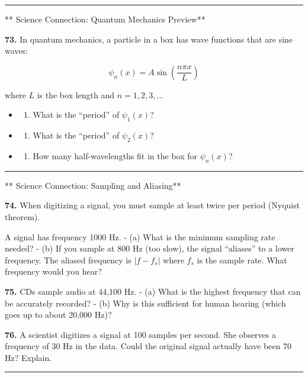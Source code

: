\documentclass[
  11pt,
]{article}
\providecommand{\tightlist}{%
  \setlength{\itemsep}{0pt}\setlength{\parskip}{0pt}}
\begin{document}
\begin{center}\rule{0.5\linewidth}{0.5pt}\end{center}

** Science Connection: Quantum Mechanics Preview**

\textbf{73.} In quantum mechanics, a particle in a box has wave
functions that are sine waves:

\[\psi_n(x) = A\sin\left(\frac{n\pi x}{L}\right)\]

where \(L\) is the box length and \(n = 1, 2, 3, ...\)

\begin{itemize}
\item
  \begin{enumerate}
  \def\labelenumi{(\alph{enumi})}
  \tightlist
  \item
    What is the ``period'' of \(\psi_1(x)\)?
  \end{enumerate}
\item
  \begin{enumerate}
  \def\labelenumi{(\alph{enumi})}
  \setcounter{enumi}{1}
  \tightlist
  \item
    What is the ``period'' of \(\psi_2(x)\)?
  \end{enumerate}
\item
  \begin{enumerate}
  \def\labelenumi{(\alph{enumi})}
  \setcounter{enumi}{2}
  \tightlist
  \item
    How many half-wavelengths fit in the box for \(\psi_n(x)\)?
  \end{enumerate}
\end{itemize}

\begin{center}\rule{0.5\linewidth}{0.5pt}\end{center}

** Science Connection: Sampling and Aliasing**

\textbf{74.} When digitizing a signal, you must sample at least twice
per period (Nyquist theorem).

A signal has frequency 1000 Hz. - (a) What is the minimum sampling rate
needed? - (b) If you sample at 800 Hz (too slow), the signal ``aliases''
to a lower frequency. The aliased frequency is \(|f - f_s|\) where
\(f_s\) is the sample rate. What frequency would you hear?

\textbf{75.} CDs sample audio at 44,100 Hz. - (a) What is the highest
frequency that can be accurately recorded? - (b) Why is this sufficient
for human hearing (which goes up to about 20,000 Hz)?

\textbf{76.} A scientist digitizes a signal at 100 samples per second.
She observes a frequency of 30 Hz in the data. Could the original signal
actually have been 70 Hz? Explain.

\begin{center}\rule{0.5\linewidth}{0.5pt}\end{center}
\end{document}
